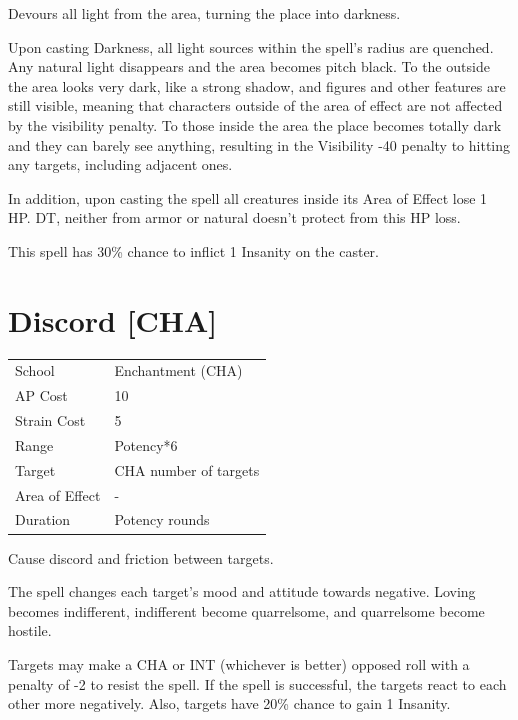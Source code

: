 \documentclass[11pt,a4paper,twocolumn]{book}
\begin{document}
\medskip

Devours all light from the area, turning the place into darkness.

Upon casting Darkness, all light sources within the spell's radius are quenched. Any natural light disappears and the area becomes pitch black. To the outside the area looks very dark, like a strong shadow, and figures and other features are still visible, meaning that characters outside of the area of effect are not affected by the visibility penalty. To those inside the area the place becomes totally dark and they can barely see anything, resulting in the Visibility -40 penalty to hitting any targets, including adjacent ones.

In addition, upon casting the spell all creatures inside its Area of Effect lose 1 HP. DT, neither from armor or natural doesn't protect from this HP loss.

This spell has 30\% chance to inflict 1 Insanity on the caster.


\section*{Discord [CHA]}
{
	\begin{tabu} to 75mm{| X[l,4] | X[l,7] |}
		\hline
		School 			& Enchantment (CHA) 	\\
        AP Cost	      	& 10 					\\
        Strain Cost     & 5 					\\
        Range     		& Potency*6 			\\
        Target      	& CHA number of targets	\\
        Area of Effect  & -  	 				\\
        Duration     	& Potency rounds 		\\ \hline
	\end{tabu}
		
}

\medskip

Cause discord and friction between targets.

The spell changes each target's mood and attitude towards negative. Loving becomes indifferent, indifferent become quarrelsome, and quarrelsome become hostile.

Targets may make a CHA or INT (whichever is better) opposed roll with a penalty of -2 to resist the spell. If the spell is successful, the targets react to each other more negatively. Also, targets have 20\% chance to gain 1 Insanity. 
\end{document}

